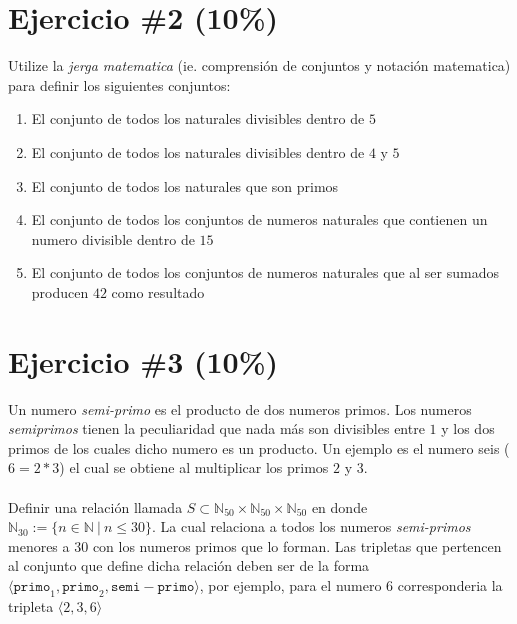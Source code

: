 \documentclass{article}
\begin{document}
\section*{Ejercicio \#2 (10\%)}
Utilize la \emph{jerga matematica} (ie. comprensi\'on de conjuntos y notaci\'on matematica) para definir los siguientes conjuntos:
\begin{enumerate}
        \item{El conjunto de todos los naturales divisibles dentro de $5$}
        \item{El conjunto de todos los naturales divisibles dentro de $4$ y $5$}
        \item{El conjunto de todos los naturales que son primos}
        \item{El conjunto de todos los conjuntos de numeros naturales que contienen
        un numero divisible dentro de $15$}
        \item{El conjunto de todos los conjuntos de numeros naturales que al ser sumados
        producen $42$ como resultado}
\end{enumerate}

\section*{Ejercicio \#3 (10\%)}

Un numero \emph{semi-primo} es el producto de dos numeros primos. Los numeros
\emph{semiprimos} tienen la peculiaridad que nada m\'as son divisibles
entre $1$ y los dos primos de los cuales dicho numero es un producto. Un ejemplo
es el numero seis ($6=2*3$) el cual se obtiene al multiplicar los primos $2$ y $3$.
\\\\
Definir una relaci\'on llamada $S\subset \mathbb{N}_{50}\times\mathbb{N}_{50}\times\mathbb{N}_{50}$ en
donde $\mathbb{N}_{30}:=\{ n \in \mathbb{N}\ |\ n\leq 30 \}$. La cual relaciona a todos los numeros
\emph{semi-primos} menores a $30$ con los numeros primos que lo forman. Las tripletas que pertencen
al conjunto que define dicha relaci\'on deben ser de la forma $\langle \mathtt{primo}_1,\mathtt{primo}_2,
\mathtt{semi-primo} \rangle$, por ejemplo, para el numero $6$ corresponderia la tripleta $\langle 2,3,6 \rangle$
\end{document}

